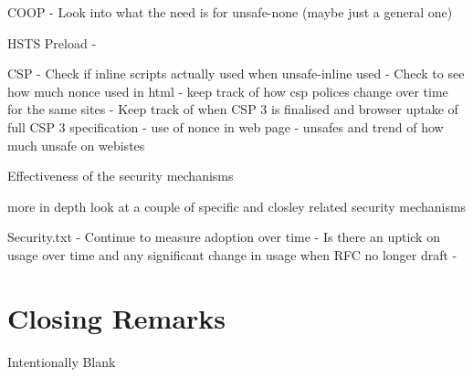 \documentclass{mscreport}
\begin{document}
\vspace{0.3cm} \noindent
COOP
- Look into what the need is for unsafe-none (maybe just a general one)


\vspace{0.3cm} \noindent
HSTS Preload
- 

\vspace{0.3cm} \noindent
CSP
- Check if inline scripts actually used when unsafe-inline used
- Check to see how much nonce used in html
- keep track of how csp polices change over time for the same sites
- Keep track of when CSP 3 is finalised and browser uptake of full CSP 3 specification
- use of nonce in web page
- unsafes and trend of how much unsafe on webistes

\vspace{0.3cm} \noindent
Effectiveness of the security mechanisms

\vspace{0.3cm} \noindent
more in depth look at a couple of specific and closley related security mechanisms

\vspace{0.3cm} \noindent
Security.txt
- Continue to measure adoption over time
- Is there an uptick on usage over time and any significant change in usage when RFC no longer draft
- 


\newpage

\section{Closing Remarks}

\newpage

\setcounter{page}{1}
\vspace*{\fill}
\begin{center}
\begin{huge}
Intentionally Blank
\end{huge}
\end{center}
\vspace{\fill}

\newpage






\newpage
\end{document}
